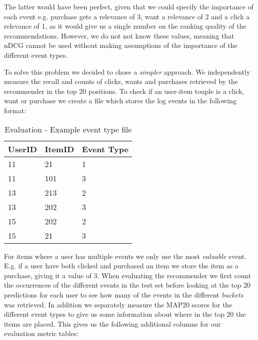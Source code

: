 The latter would have been perfect, given that we could specify the importance of each event e.g. purchase gets a relevance of 3, want
a relevance of 2 and a click a relevance of 1, as it would give us a single number on the ranking quality of the recommendations.
However, we do not not know these values, meaning that nDCG cannot be used without making assumptions of the importance of the different
event types.


To solve this problem we decided to chose a \emph{simpler} approach. We independently measure the recall and counts of clicks,
wants and purchases retrieved by the recommender in the top 20 positions. To check if an user-item touple is a click, want or purchase
we create a file which stores the log events in the following format:

\begin{table}[H]
\label{table:event-type}
\centering
\begin{tabular}{*{3}l}
\toprule
UserID	&	ItemID	 &  Event Type  \\ \midrule
11		&	21		 &	1			\\
11		&	101		 &	3			\\
13		&	213		 &	2			\\
13		&	202		 &  3			\\
15		&	202		 &  2			\\
15		&	21		 &  3			\\
\bottomrule
\end{tabular}
\caption{Evaluation - Example event type file}
\end{table}

For items where a user has multiple events we only use the most \emph{valuable} event. E.g. if a user have
both clicked and purchased an item we store the item as a purchase, giving it a value of 3.
When evaluating the recommender we first count the occurrences of the different events in the test set before looking at the top 20 predictions
for each user to see how many of the events in the different \emph{buckets} was retrieved. In addition we separately measure the MAP\@20 scores
for the different event types to give us some information about where in the top 20 the items are placed. This gives us the following
additional columns for our evaluation metric tables:


